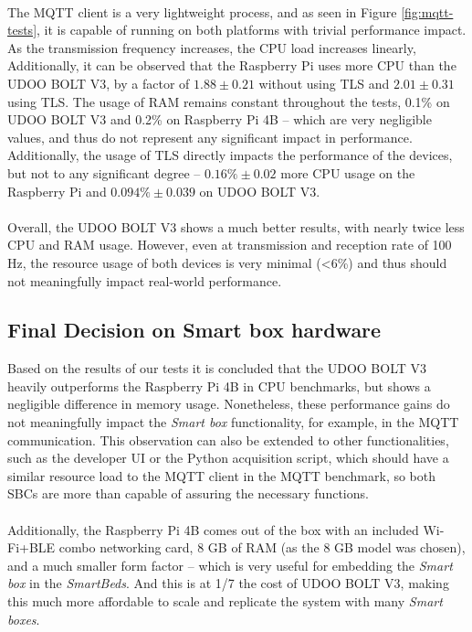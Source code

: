 \paragraph{} The \acs{MQTT} client is a very lightweight process, and as seen in Figure \ref{fig:mqtt-tests}, it is capable of running on both platforms with trivial performance impact. As the transmission frequency increases, the \acs{CPU} load increases linearly, Additionally, it can be observed that the Raspberry Pi uses more \acs{CPU} than the UDOO BOLT V3, by a factor of $1.88 \pm 0.21$ without using \acs{TLS} and $2.01 \pm 0.31$ using \acs{TLS}. The usage of \acs{RAM} remains constant throughout the tests, 0.1\% on UDOO BOLT V3 and 0.2\% on Raspberry Pi 4B -- which are very negligible values, and thus do not represent any significant impact in performance. Additionally, the usage of \acs{TLS} directly impacts the performance of the devices, but not to any significant degree -- $0.16\% \pm 0.02$ more \acs{CPU} usage on the Raspberry Pi and $0.094\% \pm 0.039$ on UDOO BOLT V3.

\paragraph{} Overall, the UDOO BOLT V3 shows a much better results, with nearly twice less \acs{CPU} and \acs{RAM} usage. However, even at transmission and reception rate of 100 Hz, the resource usage of both devices is very minimal (<6\%) and thus should not meaningfully impact real-world performance.

\subsection{Final Decision on Smart box hardware}

Based on the results of our tests it is concluded that the UDOO BOLT V3 heavily outperforms the Raspberry Pi 4B in \acs{CPU} benchmarks, but shows a negligible difference in memory usage. Nonetheless, these performance gains do not meaningfully impact the \textit{Smart box} functionality, for example, in the \acs{MQTT} communication. This observation can also be extended to other functionalities, such as the developer \acs{UI} or the Python acquisition script, which should have a similar resource load to the \acs{MQTT} client in the \acs{MQTT} benchmark, so both \acs{SBC}s are more than capable of assuring the necessary functions.

\paragraph{} Additionally, the Raspberry Pi 4B comes out of the box with an included Wi-Fi+\acs{BLE} combo networking card, 8 GB of \acs{RAM} (as the 8 GB model was chosen), and a much smaller form factor -- which is very useful for embedding the \textit{Smart box} in the \textit{SmartBeds}. And this is at 1/7 the cost of UDOO BOLT V3, making this much more affordable to scale and replicate the system with many \textit{Smart boxes}.

